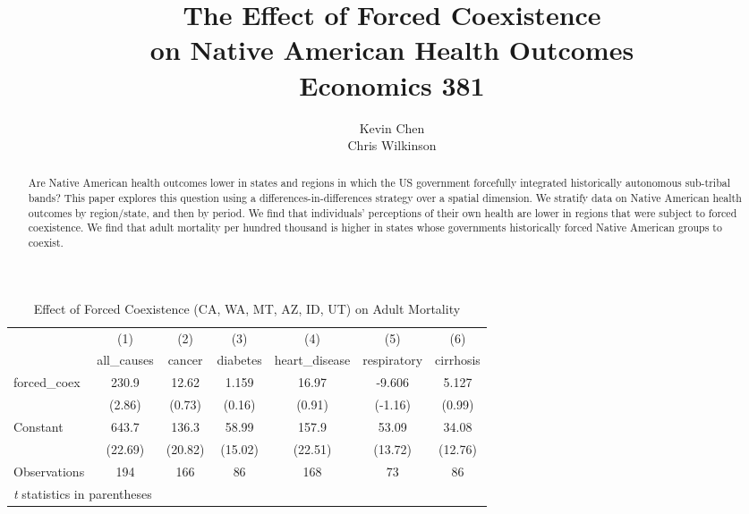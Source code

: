 \documentclass[12pt]{article}
\title{
The Effect of Forced Coexistence \\ on Native American Health Outcomes \\ 
{\small \sc Economics 381}
}
\author{Kevin Chen \\ Chris Wilkinson}
\begin{document}

\maketitle

\begin{abstract}
Are Native American health outcomes lower in states and regions in which the US government forcefully integrated historically autonomous sub-tribal bands? This paper explores this question using a differences-in-differences strategy over a spatial dimension. We stratify data on Native American health outcomes by region/state, and then by period. We find that individuals' perceptions of their own health are lower in regions that were subject to forced coexistence. We find that adult mortality per hundred thousand is higher in states whose governments historically forced Native American groups to coexist.
\end{abstract}

\newpage

\begin{table}[htbp]\centering \caption{Effect of Forced Coexistence (CA, WA, MT, AZ, ID, UT) on Adult Mortality\label{adult4}} \begin{tabular}{l*{6}{c}} \toprule
                    &\multicolumn{1}{c}{(1)}&\multicolumn{1}{c}{(2)}&\multicolumn{1}{c}{(3)}&\multicolumn{1}{c}{(4)}&\multicolumn{1}{c}{(5)}&\multicolumn{1}{c}{(6)}\\
                    &\multicolumn{1}{c}{all\_causes}&\multicolumn{1}{c}{cancer}&\multicolumn{1}{c}{diabetes}&\multicolumn{1}{c}{heart\_disease}&\multicolumn{1}{c}{respiratory}&\multicolumn{1}{c}{cirrhosis}\\
\midrule
forced\_coex         &       230.9&       12.62&       1.159&       16.97&      -9.606&       5.127\\
                    &      (2.86)&      (0.73)&      (0.16)&      (0.91)&     (-1.16)&      (0.99)\\
\addlinespace
Constant            &       643.7&       136.3&       58.99&       157.9&       53.09&       34.08\\
                    &     (22.69)&     (20.82)&     (15.02)&     (22.51)&     (13.72)&     (12.76)\\
\midrule
Observations        &         194&         166&          86&         168&          73&          86\\
\bottomrule
\multicolumn{7}{l}{\footnotesize \textit{t} statistics in parentheses}\\
\end{tabular}
\end{table}
\end{document}
